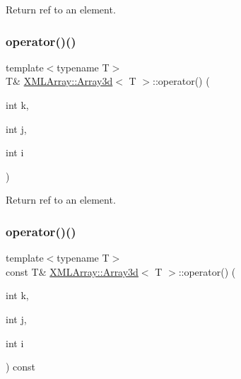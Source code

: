 Return ref to an element. 

\mbox{\label{classXMLArray_1_1Array3d_a2c17e47922ca191dbce50300c6dd6785}} 
\subsubsection{\texorpdfstring{operator()()}{operator()()}\hspace{0.1cm}{\footnotesize\ttfamily [2/4]}}
{\footnotesize\ttfamily template$<$typename T$>$ \\
T\& \mbox{\hyperlink{classXMLArray_1_1Array3d}{X\+M\+L\+Array\+::\+Array3d}}$<$ T $>$\+::operator() (\begin{DoxyParamCaption}\item[{int}]{k,  }\item[{int}]{j,  }\item[{int}]{i }\end{DoxyParamCaption})\hspace{0.3cm}{\ttfamily [inline]}}



Return ref to an element. 

\mbox{\label{classXMLArray_1_1Array3d_a177102edcf9ac47e8dbf50311d9e5549}} 
\subsubsection{\texorpdfstring{operator()()}{operator()()}\hspace{0.1cm}{\footnotesize\ttfamily [3/4]}}
{\footnotesize\ttfamily template$<$typename T$>$ \\
const T\& \mbox{\hyperlink{classXMLArray_1_1Array3d}{X\+M\+L\+Array\+::\+Array3d}}$<$ T $>$\+::operator() (\begin{DoxyParamCaption}\item[{int}]{k,  }\item[{int}]{j,  }\item[{int}]{i }\end{DoxyParamCaption}) const\hspace{0.3cm}{\ttfamily [inline]}}



